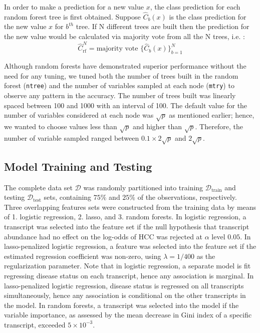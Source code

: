 \documentclass[a4paper]{article}
\begin{document}
In order to make a prediction for a new value $x$, the class prediction for each random forest tree is first obtained. Suppose $\hat{C}_b(x)$ is the class prediction for the new value $x$ for $b^{th}$ tree. If N different trees are built then the prediction for the new value would be calculated via majority vote from all the N trees, i.e. :
\begin{equation}
\hat{C}_{\text{rf}}^{N} = \text{majority vote }\{\hat{C}_{b}(x)\}_{b=1}^{N}
\end{equation}

Although random forests have demonstrated superior performance without the need for any tuning, we tuned both the number of trees built in the random forest (\texttt{ntree}) and the number of variables sampled at each node (\texttt{mtry}) to observe any pattern in the accuracy. The number of trees built was linearly spaced between 100 and 1000 with an interval of 100. The default value for the number of variables considered at each node was $\sqrt{p}$ as mentioned earlier; hence, we wanted to choose values less than $\sqrt{p}$ and higher than $\sqrt{p}$. Therefore, the number of variable sampled ranged between $0.1\times2 \sqrt{p}$ and $2 \sqrt{p}$.

\subsection{Model Training and Testing}
The complete data set $\mathcal{D}$ was randomly partitioned into training $\mathcal{D}_{\text{train}}$ and testing $\mathcal{D}_{\text{test}}$ sets, containing $75\%$ and $25\%$ of the observations, respectively. Three overlapping features sets were constructed from the training data by means of 1. logistic regression, 2. lasso, and 3. random forests. In logistic regression, a transcript was selected into the feature set if the null hypothesis that transcript abundance had no effect on the log-odds of HCC was rejected at $\alpha$ level $0.05$. In lasso-penalized logistic regression, a feature was selected into the feature set if the estimated regression coefficient was non-zero, using $\lambda = 1/400$ as the regularization parameter. Note that in logistic regression, a separate model is fit regressing disease status on each transcript, hence any association is marginal. In lasso-penalized logistic regression, disease status is regressed on all transcripts simultaneously, hence any association is conditional on the other transcripts in the model. In random forests, a transcript was selected into the model if the variable importance, as assessed by the mean decrease in Gini index of a specific transcript, exceeded $5 \times 10^{-3}$.
\end{document}
